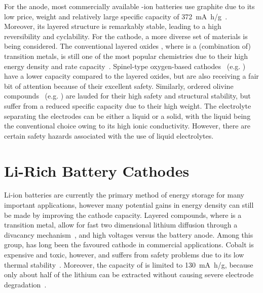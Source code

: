 \begin{refsection}
 
For the anode, most commercially available -ion batteries use graphite 
due to its low price, weight and relatively large specific capacity of 
372~\si{\milli\ampere\hour/\gram}~\cite{Mao2018}. Moreover, its layered 
structure is remarkably stable, leading to  a high reversibility and 
cyclability. For the cathode, a more diverse set of materials is being 
considered. The conventional layered oxides , where  is a 
(combination of) transition metals, is still one of the most popular 
chemistries due to their high energy density and rate capacity~\cite{Bresser2015}. Spinel-type 
oxygen-based cathodes~\cite{Thackeray2004} (e.g. ) have a lower capacity compared to 
the layered oxides, but are also receiving a fair bit of attention because of 
their excellent safety. Similarly, ordered olivine compounds~\cite{Padhi1997} (e.g. ) are lauded for their 
high safety and structural stability, but suffer from a reduced specific 
capacity due to their high weight. The electrolyte separating the electrodes 
can be either a liquid or a solid, 
with the liquid being the conventional choice owing to its high ionic 
conductivity. However, there are certain safety hazards associated with the 
use of liquid electrolytes. 

\section{Li-Rich Battery Cathodes} \label{batteries:sec-lirich} 
 
Li-ion batteries are currently the primary method of energy storage for many 
important applications, however many potential gains in energy density can 
still be made by improving the cathode capacity. Layered  compounds, 
where  is a transition metal, allow for fast two dimensional lithium 
diffusion through a divacancy mechanism~\cite{VanderVen2001}, and high 
voltages versus the battery anode. Among this group,  has long been 
the favoured cathode in commercial applications. Cobalt is expensive and 
toxic, however, and suffers from safety problems due to its low thermal 
stability~\cite{Larcher2015}. Moreover, the capacity of  is limited 
to 130~\si{\milli\ampere\hour/\gram}, because only about half of the lithium 
can be extracted without causing severe electrode 
degradation~\cite{Rozier2015}. 
 

\end{refsection}
